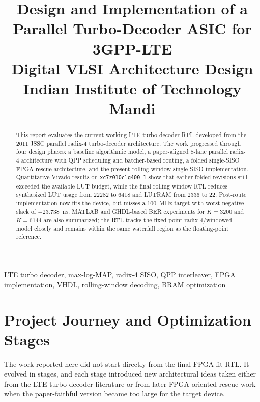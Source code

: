 \documentclass[conference]{IEEEtran}
\title{Design and Implementation of a Parallel Turbo-Decoder ASIC for 3GPP-LTE\\[0.5em]
\large Digital VLSI Architecture Design\\
\large Indian Institute of Technology Mandi}
\author{
\IEEEauthorblockN{G.~Sai Vamshi (B23263), G.~Uma Bharathi (B23262), M.~S.~S.~Harshitha (B23272), and V.~Sharanya (B23506)}
\IEEEauthorblockA{Group Number: 10}
}
\begin{document}
\maketitle

\begin{abstract}
This report evaluates the current working LTE turbo-decoder RTL developed from the 2011 JSSC parallel radix-4 turbo-decoder architecture. The work progressed through four design phases: a baseline algorithmic model, a paper-aligned 8-lane parallel radix-4 architecture with QPP scheduling and batcher-based routing, a folded single-SISO FPGA rescue architecture, and the present rolling-window single-SISO implementation. Quantitative Vivado results on \texttt{xc7z010clg400-1} show that earlier folded revisions still exceeded the available LUT budget, while the final rolling-window RTL reduces synthesized LUT usage from \num{22282} to \num{6418} and LUTRAM from \num{2336} to \num{22}. Post-route implementation now fits the device, but misses a \SI{100}{MHz} target with worst negative slack of \SI{-23.738}{ns}. MATLAB and GHDL-based BER experiments for \(K=3200\) and \(K=6144\) are also summarized; the RTL tracks the fixed-point radix-4/windowed model closely and remains within the same waterfall region as the floating-point reference.
\end{abstract}

\begin{IEEEkeywords}
LTE turbo decoder, max-log-MAP, radix-4 SISO, QPP interleaver, FPGA implementation, VHDL, rolling-window decoding, BRAM optimization
\end{IEEEkeywords}

\section{Project Journey and Optimization Stages}
The work reported here did not start directly from the final FPGA-fit RTL. It evolved in stages, and each stage introduced new architectural ideas taken either from the LTE turbo-decoder literature or from later FPGA-oriented rescue work when the paper-faithful version became too large for the target device.
\end{document}
